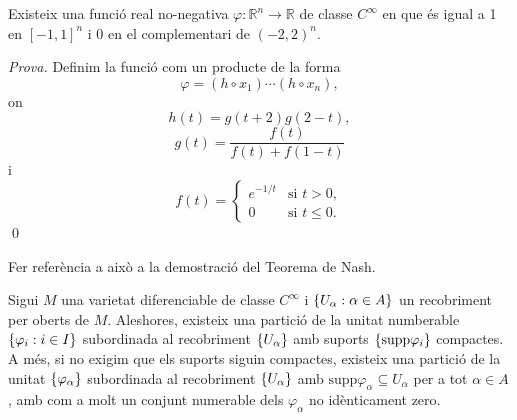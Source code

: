\begin{lema}
    Existeix una funció real no-negativa $\varphi:\mathbb R^n\to\mathbb R$ de classe $C^\infty$ en que és igual a 1 en $[-1,1]^n$ i $0$ en el complementari de $(-2,2)^n$.
\end{lema}
{\color{green!50!black} \textit{Prova.} Definim la funció com un producte de la forma
\begin{equation}\label{eq:phi}
    \varphi = (h\circ x_1)\cdots(h\circ x_n),
\end{equation}
on
\begin{equation*}
    h(t) = g(t+2)g(2-t),
\end{equation*}
\begin{equation*}
    g(t) = \frac{f(t)}{f(t) + f(1-t)}
\end{equation*}
i 
\begin{equation*}
    f(t) = \begin{cases}
        e^{-1/t} & \text{si } t > 0, \\
        0 & \text{si } t\le 0.
    \end{cases}
\end{equation*}
\qed
}
\begin{teo}
    {\color{blue}Fer referència a això a la demostració del Teorema de Nash.}

    Sigui $M$ una varietat diferenciable de classe $C^\infty$ i $\{U_\alpha:\alpha\in A\}$ un recobriment per oberts de $M$. Aleshores, existeix una partició de la unitat numberable $\{\varphi_i:i\in I\}$ subordinada al recobriment $\{U_\alpha\}$ amb suports $\{\text{supp}\varphi_i\}$ compactes. A més, si no exigim que els suports siguin compactes, existeix una partició de la unitat $\{\varphi_\alpha\}$ subordinada al recobriment $\{U_\alpha\}$ amb $\text{supp}\varphi_\alpha \subseteq U_\alpha$ per a tot $\alpha\in A$, amb com a molt un conjunt numerable dels $\varphi_\alpha$ no idènticament zero.
\end{teo}
